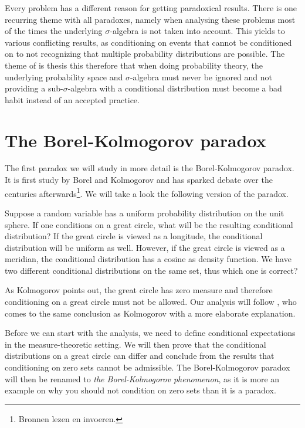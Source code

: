 \documentclass[twoside,a4paper]{report}
\theoremstyle{plain}
\theoremstyle{definition}
\theoremstyle{remark}
\numberwithin{equation}{chapter}
\DeclareMathOperator{\1}{\mathbbm{1}}
\begin{document}
Every problem has a different reason for getting paradoxical results. There is one recurring theme with all paradoxes, namely when analysing these problems most of the times the underlying $\sigma$-algebra is not taken into account. This yields to various conflicting results, as conditioning on events that cannot be conditioned on to not recognizing that multiple probability distributions are possible. The theme of is thesis this therefore that when doing probability theory, the underlying probability space and $\sigma$-algebra must never be ignored and not providing a sub-$\sigma$-algebra with a conditional distribution must become a bad habit instead of an accepted practice.

\chapter{The Borel-Kolmogorov paradox}\label{chap:BorelKolmogorov}
The first paradox we will study in more detail is the Borel-Kolmogorov paradox. It is first study by Borel \cite{Borel09} and Kolmogorov \cite{Kolmogorov33} and has sparked debate over the centuries afterwards\footnote{Bronnen lezen en invoeren.}. We will take a look the following version of the paradox.

Suppose a random variable has a uniform probability distribution on the unit sphere. If one conditions on a great circle, what will be the resulting conditional distribution? If the great circle is viewed as a longitude, the conditional distribution will be uniform as well. However, if the great circle is viewed as a meridian, the conditional distribution has a cosine as density function. We have two different conditional distributions on the same set, thus which one is correct?

As Kolmogorov \cite{Kolmogorov33} points out, the great circle has zero measure and therefore conditioning on a great circle must not be allowed. Our analysis will follow \cite{Gyenis17}, who comes to the same conclusion as Kolmogorov with a more elaborate explanation.

Before we can start with the analysis, we need to define conditional expectations in the measure-theoretic setting. We will then prove that the conditional distributions on a great circle can differ and conclude from the results that conditioning on zero sets cannot be admissible. The Borel-Kolmogorov paradox will then be renamed to \emph{the Borel-Kolmogorov phenomenon}, as it is more an example on why you should not condition on zero sets than it is a paradox.
\end{document}
